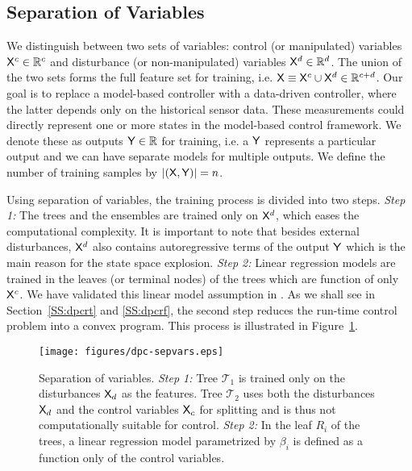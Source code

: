 \subsection{Separation of Variables}
\label{SS:sepvar}
We distinguish between two sets of variables: control (or manipulated) variables $\mathsf{X}^c \in \mathbb{R}^c$ and disturbance (or non-manipulated) variables $\mathsf{X}^d \in \mathbb{R}^d$. The union of the two sets forms the full feature set for training, i.e. $\mathsf{X} \equiv \mathsf{X}^c \cup \mathsf{X}^d \in \mathbb{R}^{c+d}$.
Our goal is to replace a model-based controller with a data-driven controller, where the latter depends only on the historical sensor data. 
These measurements could directly represent one or more states in the model-based control framework. We denote these as outputs $\mathsf{Y} \in \mathbb{R}$ for training, i.e. a $\mathsf{Y}$ represents a particular output and we can have separate models for multiple outputs. We define the number of training samples by $|(\mathsf{X},\mathsf{Y})| = n$.

Using separation of variables, the training process is divided into two steps. \textit{Step 1:} The trees and the ensembles are trained only on $\mathsf{X}^d$, which eases the computational complexity. It is important to note that besides external disturbances, $\mathsf{X}^d$ also contains autoregressive terms of the output $\mathsf{Y}$ which is the main reason for the state space explosion. \textit{Step 2:} Linear regression models are trained in the leaves (or terminal nodes) of the trees which are function of only $\mathsf{X}^c$. We have validated this linear model assumption in \cite{Jain2016}. As we shall see in Section~\ref{SS:dpcrt} and \ref{SS:dpcrf}, the second step reduces the run-time control problem into a convex program. This process is illustrated in Figure~\ref{F:dpc-sepvars}.
\begin{figure}[t!]
	\centering
	\texttt{[image: figures/dpc-sepvars.eps]}
	\caption{Separation of variables. \textit{Step 1:} Tree $\mathcal{T}_1$ is trained only on the disturbances $\mathsf{X}_d$ as the features. Tree $\mathcal{T}_2$ uses both the disturbances $\mathsf{X}_d$ and the control variables $\mathsf{X}_c$ for splitting and is thus not computationally suitable for control. \textit{Step 2:} In the leaf $R_i$ of the trees, a linear regression model parametrized by $\beta_i$ is defined as a function only of the control variables.}
	\captionsetup{justification=centering}
	\label{F:dpc-sepvars}
\end{figure}

